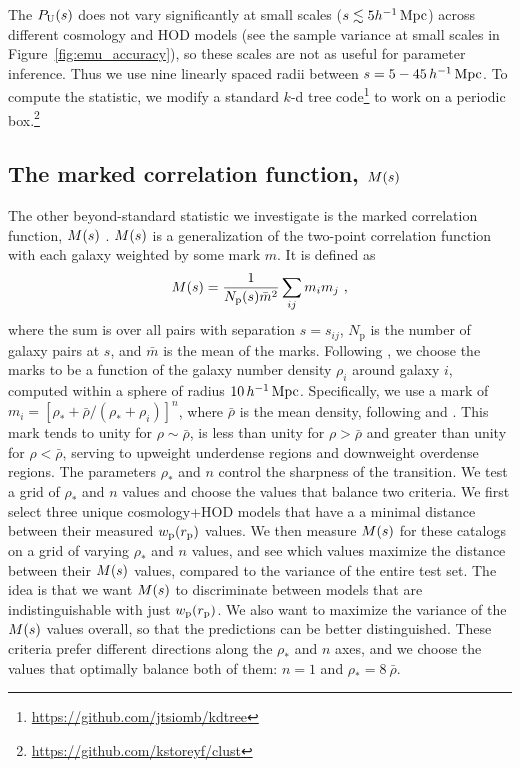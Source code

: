 The $P_\mathrm{U}(s)$ does not vary significantly at small scales ($s \lesssim 5 h^{-1}\,\mathrm{Mpc}$) across different cosmology and HOD models (see the sample variance at small scales in Figure~\ref{fig:emu_accuracy}), so these scales are not as useful for parameter inference.
Thus we use nine linearly spaced radii between $s = 5-45 \, h^{-1}\,\mathrm{Mpc}$.
To compute the statistic, we modify a standard $k$-d tree code\footnote{\url{https://github.com/jtsiomb/kdtree}} to work on a periodic box.\footnote{\url{https://github.com/kstoreyf/clust}} 

\subsection{The marked correlation function, \texorpdfstring{$M(s)$}{M(s)}}
\label{sec:mcf}

The other beyond-standard statistic we investigate is the marked correlation function, $M(s)$ \citep{Sheth2004}.
$M(s)$ is a generalization of the two-point correlation function with each galaxy weighted by some mark $m$.
It is defined as 
\begin{equation}
	M(s) = \frac{1}{N_\mathrm{p}(s) \bar{m}^2} \sum_{ij} m_i m_j ~,  
\end{equation}
where the sum is over all pairs with separation $s = s_{ij}$, $N_\mathrm{p}$ is the number of galaxy pairs at $s$, and $\bar{m}$ is the mean of the marks.
Following \cite{WhitePadmanabhan2009}, we choose the marks to be a function of the galaxy number density $\rho_i$ around  galaxy $i$, computed within a sphere of radius $10 \, h^{-1}\,\mathrm{Mpc}$.
Specifically, we use a mark of $m_i = [\rho_* + \bar{\rho}/(\rho_* + \rho_i)]^n$, where $\bar{\rho}$ is the mean density, following \cite{White2016} and \cite{Satpathy2019}. 
This mark tends to unity for $\rho \sim \bar{\rho}$, is less than unity for $\rho > \bar{\rho}$ and greater than unity for $\rho < \bar{\rho}$, serving to upweight underdense regions and downweight overdense regions.
The parameters $\rho_*$ and $n$ control the sharpness of the transition.
We test a grid of  $\rho_*$ and $n$ values and choose the values that balance two criteria.
We first select three unique cosmology+HOD models that have a a minimal distance between their measured $w_\mathrm{p}(r_\mathrm{p})$ values.
We then measure $M(s)$ for these catalogs on a grid of varying $\rho_*$ and $n$ values, and see which values maximize the distance between their $M(s)$ values, compared to the variance of the entire test set.
The idea is that we want $M(s)$ to discriminate between models that are indistinguishable with just $w_\mathrm{p}(r_\mathrm{p})$.
We also want to maximize the variance of the $M(s)$ values overall, so that the predictions can be better distinguished.
These criteria prefer different directions along the $\rho_*$ and $n$ axes, and we choose the values that optimally balance both of them: $n=1$ and $\rho_*=8 \: \bar{\rho}$.


